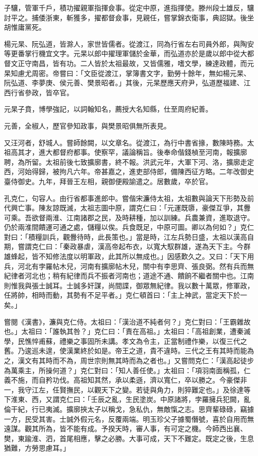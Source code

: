 \begin{pinyinscope}
子驤，管軍千戶，積功擢親軍指揮僉事。從定中原，進指揮使。滕州段士雄反，驤討平之。捕倭浙東，斬獲多，擢都督僉事，見親任，嘗掌錦衣衛事，典詔獄。後坐胡惟庸黨死。

楊元杲、阮弘道，皆滁人，家世皆儒者。從渡江，同為行省左右司員外郎，與陶安等更番掌行機宜文字。元杲以郎中擢理軍儲於金華，而弘道亦於是歲以郎中從大都督文正守南昌，皆有功。二人皆於太祖最故，又皆儒雅，嗜文學，練達政體，而元杲知慮尤周密。帝嘗曰：「文臣從渡江，掌簿書文字，勤勞十餘年，無如楊元杲、阮弘道、李夢庚、侯元善、樊景昭者。」其後，元杲歷應天府尹，弘道歷福建、江西行省參政，皆卒官。

元杲子賁，博學強記，以詞翰知名，薦授大名知縣，仕至周府紀善。

元善，全椒人，歷官參知政事，與樊景昭俱無所表見。

又汪河者，舒城人。嘗師餘闕，以文章名。從渡江，為行中書省掾，數陳時務。太祖高其才，進大都督府都事。使察罕，議論稱旨。後奉命偕錢楨至河南，報擴廓聘，為所留。太祖前後七致擴廓書，終不報。洪武元年，大軍下河、洛，擴廓走定西，河始得歸，被拘凡六年。帝甚嘉之，進吏部侍郎，備陳西征方略。二年改御史臺侍御史。九年，拜晉王左相，親御便殿諭遣之。居數歲，卒於官。

孔克仁，句容人。由行省都事進郎中。嘗偕宋濂侍太祖，太祖數與論天下形勢及前代興亡事。陳友諒既滅，太祖志圖中原，謂克仁曰：「元運既隳，豪傑互爭，其釁可乘。吾欲督兩淮、江南諸郡之民，及時耕種，加以訓練。兵農兼資，進取退守。仍於兩淮間饋運可通之處，儲糧以俟。兵食既足，中原可圖。卿以為何如？」克仁對曰：「積糧訓兵，觀釁待時，此長策也。」當是時，江左兵勢日盛，太祖以漢高自期，嘗謂克仁曰：「秦政暴虐，漢高帝起布衣，以寬大馭群雄，遂為天下主。今群雄蜂起，皆不知修法度以明軍政，此其所以無成也。」因感歎久之。又曰：「天下用兵，河北有孛羅帖木兒，河南有擴廓帖木兒，關中有李思齊、張良弼。然有兵而無紀律者河北也；稍有紀律而兵不振者河南也；道途不通、饋餉不繼者關中也。江南則惟我與張士誠耳。士誠多奸謀，尚間諜，御眾無紀律。我以數十萬眾，修軍政，任將帥，相時而動，其勢有不足平者。」克仁頓首曰：「主上神武，當定天下於一矣。」

嘗閱《漢書》，濂與克仁侍。太祖曰：「漢治道不純者何？」克仁對曰：「王霸雜故也。」太祖曰：「誰執其咎？」克仁曰：「責在高祖。」太祖曰：「高祖創業，遭秦滅學，民憔悴甫蘇，禮樂之事固所未講。孝文為令主，正當制禮作樂，以復三代之舊。乃逡巡未遑，使漢業終於如是。帝王之道，貴不違時。三代之王有其時而能為之，漢文有其時而不為，周世宗則無其時而為之者也。」又嘗問克仁：「漢高起徒步為萬乘主，所操何道？」克仁對曰：「知人善任使。」太祖曰：「項羽南面稱孤，仁義不施，而自矜功伐。高祖知其然，承以柔遜，濟以寬仁，卒以勝之。今豪傑非一，我守江左，任賢撫民，以觀天下之變。若徒與角力，則猝難定也。」及徐達等下淮東、西，又謂克仁曰：「壬辰之亂，生民塗炭。中原諸將，孛羅擁兵犯闕，亂倫干紀，行已夷滅。擴廓挾太子以稱戈，急私仇，無敵愾之志。思齊輩碌碌，竊據一方，民受其害。士誠外假元名，反覆兩端。明玉珍父子據蜀僭號，喜於自用而無遠謀。觀其所為，皆不能有成。予揆天時，審人事，有可定之機。今師西出襄、樊，東踰淮、泗，首尾相應，擊之必勝。大事可成，天下不難定。既定之後，生息猶難，方勞思慮耳。」


\end{pinyinscope}
